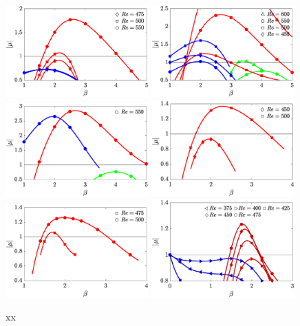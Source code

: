 \begin{figure}
  \centering
  \includegraphics[width=0.49\textwidth]{./fig/AR5s/multipliers_AR5p25.eps}  
  \includegraphics[width=0.49\textwidth]{./fig/AR5s/multipliers_AR5p5.eps}  
  \includegraphics[width=0.49\textwidth]{./fig/AR5s/multipliers_AR5p75.eps} 
  \includegraphics[width=0.49\textwidth]{./fig/AR7s/multipliers_AR6.eps}  
  \includegraphics[width=0.49\textwidth]{./fig/AR7s/multipliers_AR7.eps}
  \includegraphics[width=0.49\textwidth]{./fig/AR9s/multipliers.eps}
  \caption{xx}
  \label{fig:multipliers_long}
\end{figure}

